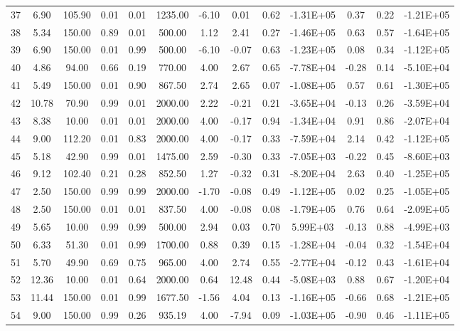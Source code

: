 \begin{landscape}
\begin{center}
\begin{longtable}{|c|c|c|c|c|c|c|c|c|c|c|c|c|}
37  & 6.90  & 105.90 & 0.01 & 0.01 & 1235.00 & -6.10 & 0.01  & 0.62 & -1.31E+05 & 0.37  & 0.22 & -1.21E+05 \\
38  & 5.34  & 150.00 & 0.89 & 0.01 & 500.00  & 1.12  & 2.41  & 0.27 & -1.46E+05 & 0.63  & 0.57 & -1.64E+05 \\
39  & 6.90  & 150.00 & 0.01 & 0.99 & 500.00  & -6.10 & -0.07 & 0.63 & -1.23E+05 & 0.08  & 0.34 & -1.12E+05 \\
40  & 4.86  & 94.00  & 0.66 & 0.19 & 770.00  & 4.00  & 2.67  & 0.65 & -7.78E+04 & -0.28 & 0.14 & -5.10E+04 \\
41  & 5.49  & 150.00 & 0.01 & 0.90 & 867.50  & 2.74  & 2.65  & 0.07 & -1.08E+05 & 0.57  & 0.61 & -1.30E+05 \\
42  & 10.78 & 70.90  & 0.99 & 0.01 & 2000.00 & 2.22  & -0.21 & 0.21 & -3.65E+04 & -0.13 & 0.26 & -3.59E+04 \\
43  & 8.38  & 10.00  & 0.01 & 0.01 & 2000.00 & 4.00  & -0.17 & 0.94 & -1.34E+04 & 0.91  & 0.86 & -2.07E+04 \\
44  & 9.00  & 112.20 & 0.01 & 0.83 & 2000.00 & 4.00  & -0.17 & 0.33 & -7.59E+04 & 2.14  & 0.42 & -1.12E+05 \\
45  & 5.18  & 42.90  & 0.99 & 0.01 & 1475.00 & 2.59  & -0.30 & 0.33 & -7.05E+03 & -0.22 & 0.45 & -8.60E+03 \\
46  & 9.12  & 102.40 & 0.21 & 0.28 & 852.50  & 1.27  & -0.32 & 0.31 & -8.20E+04 & 2.63  & 0.40 & -1.25E+05 \\
47  & 2.50  & 150.00 & 0.99 & 0.99 & 2000.00 & -1.70 & -0.08 & 0.49 & -1.12E+05 & 0.02  & 0.25 & -1.05E+05 \\
48  & 2.50  & 150.00 & 0.01 & 0.01 & 837.50  & 4.00  & -0.08 & 0.08 & -1.79E+05 & 0.76  & 0.64 & -2.09E+05 \\
49  & 5.65  & 10.00  & 0.99 & 0.99 & 500.00  & 2.94  & 0.03  & 0.70 & 5.99E+03  & -0.13 & 0.88 & -4.99E+03 \\
50  & 6.33  & 51.30  & 0.01 & 0.99 & 1700.00 & 0.88  & 0.39  & 0.15 & -1.28E+04 & -0.04 & 0.32 & -1.54E+04 \\
51  & 5.70  & 49.90  & 0.69 & 0.75 & 965.00  & 4.00  & 2.74  & 0.55 & -2.77E+04 & -0.12 & 0.43 & -1.61E+04 \\
52  & 12.36 & 10.00  & 0.01 & 0.64 & 2000.00 & 0.64  & 12.48 & 0.44 & -5.08E+03 & 0.88  & 0.67 & -1.20E+04 \\
53  & 11.44 & 150.00 & 0.01 & 0.99 & 1677.50 & -1.56 & 4.04  & 0.13 & -1.16E+05 & -0.66 & 0.68 & -1.21E+05 \\
54  & 9.00  & 150.00 & 0.99 & 0.26 & 935.19  & 4.00  & -7.94 & 0.09 & -1.03E+05 & -0.90 & 0.46 & -1.11E+05 \\

\end{longtable}
\end{center}
\end{landscape}
